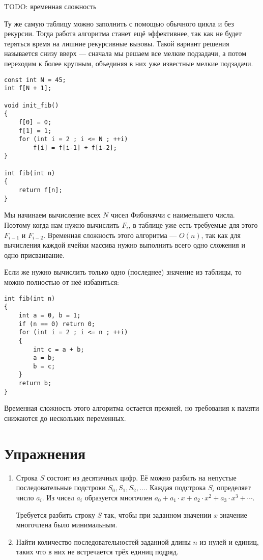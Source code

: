\documentclass[14pt,openany]{book}
\begin{document}
TODO: временная сложность

Ту же самую таблицу можно заполнить с помощью обычного цикла и без рекурсии.
Тогда работа алгоритма станет ещё эффективнее, так как не будет теряться время на
лишние рекурсивные вызовы.
Такой вариант решения называется снизу вверх --- сначала мы решаем все мелкие подзадачи,
а потом переходим к более крупным, объединяя в них уже известные мелкие подзадачи.

\begin{lstlisting}
const int N = 45;
int f[N + 1];

void init_fib()
{
    f[0] = 0;
    f[1] = 1;
    for (int i = 2 ; i <= N ; ++i)
        f[i] = f[i-1] + f[i-2];
}

int fib(int n)
{
    return f[n];
}
\end{lstlisting}

Мы начинаем вычисление всех $N$ чисел Фибоначчи с наименьшего числа. Поэтому когда нам
нужно вычислить $F_i$, в таблице уже есть требуемые для этого $F_{i-1}$ и $F_{i-2}$.
Временная сложность этого алгоритма --- $O(n)$, так как для вычисления каждой ячейки
массива нужно выполнить всего одно сложения и одно присваивание.

Если же нужно вычислить только одно (последнее) значение из таблицы, то можно полностью
от неё избавиться:

\begin{lstlisting}
int fib(int n)
{
    int a = 0, b = 1;
    if (n == 0) return 0;
    for (int i = 2 ; i <= n ; ++i)
    {
        int c = a + b;
        a = b;
        b = c;
    }
    return b;
}
\end{lstlisting}

Временная сложность этого алгоритма остается прежней, но требования к памяти снижаются
до нескольких переменных.

\section{Упражнения}

\begin{enumerate}

\item Строка $S$ состоит из десятичных цифр. Её можно разбить на непустые последовательные
      подстроки $S_0, S_1, S_2, \ldots$. Каждая подстрока $S_i$ определяет число $a_i$. Из чисел
      $a_i$ образуется многочлен $a_0 + a_1\cdot x + a_2\cdot x^2 + a_3\cdot x^3 + \cdots$.
      
      Требуется разбить строку $S$ так, чтобы при заданном значении $x$ значение многочлена
      было минимальным.

\item Найти количество последовательностей заданной длины $n$ из нулей и единиц, таких что в них
      не встречается трёх единиц подряд.

\end{enumerate}
\end{document}
